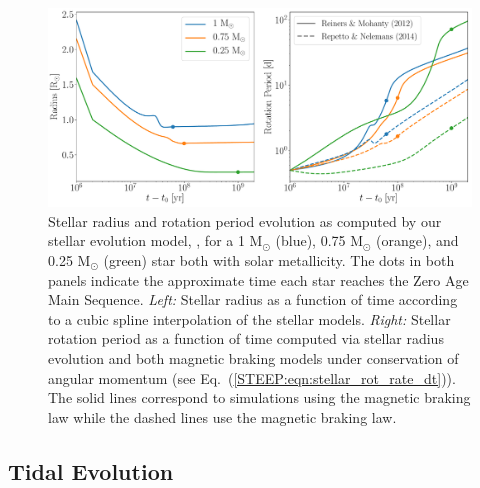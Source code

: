 \begin{figure}
	\includegraphics[width=\columnwidth]{stellar_example.pdf}
    \caption{Stellar radius and rotation period evolution as computed by our stellar evolution model, \stellar, for a 1 M$_{\odot}$ (blue), 0.75 M$_{\odot}$ (orange), and 0.25 M$_{\odot}$ (green) star both with solar metallicity. The dots in both panels indicate the approximate time each star reaches the Zero Age Main Sequence.  {\it Left:} Stellar radius as a function of time according to a cubic spline interpolation of the \citet{Baraffe2015} stellar models.  {\it Right:} Stellar rotation period as a function of time computed via stellar radius evolution and both magnetic braking models under conservation of angular momentum (see Eq.~(\ref{STEEP:eqn:stellar_rot_rate_dt})).  The solid lines correspond to simulations using the \citet{Reiners2012} magnetic braking law while the dashed lines use the \citet{Repetto2014} magnetic braking law.}
    \label{STEEP:fig:stellar_example}
\end{figure}


\subsection{Tidal Evolution} \label{STEEP:sec:tidal_evolution}

